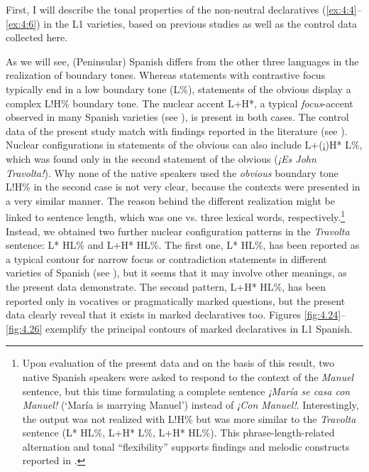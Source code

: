 First, I will describe the tonal properties of the non-neutral declaratives (\ref{ex:4:4}--\ref{ex:4:6}) in the L1 varieties, based on previous studies as well as the control data collected here.


As we will see, (Peninsular) Spanish differs from the other three languages in the realization of boundary tones. Whereas statements with contrastive focus typically end in a low boundary tone (L\%), statements of the obvious display a complex L!H\% boundary tone. The nuclear accent L+H*, a typical \textit{focus}{}-accent observed in many Spanish varieties (see \citealt{PrietoRoseano2010}), is present in both cases. The control data of the present study match with findings reported in the literature (see \citealt{Estebas-VilaplanaPrieto2010, HualdePrieto2015}). Nuclear configurations in statements of the obvious can also include L+(¡)H* L\%, which was found only in the second statement of the obvious (\textit{¡Es John Travolta!}). Why none of the native speakers used the \textit{obvious}{} boundary tone L!H\% in the second case is not very clear, because the contexts were presented in a very similar manner. The reason behind the different realization might be linked to sentence length, which was one vs. three lexical words, respectively.\footnote{Upon evaluation of the present data and on the basis of this result, two native Spanish speakers were asked to respond to the context of the \textit{Manuel} sentence, but this time formulating a complete sentence \textit{¡María se casa con Manuel!} (‘María is marrying Manuel’) instead of \textit{¡Con Manuel!}. Interestingly, the output was not realized with L!H\% but was more similar to the \textit{Travolta}{} sentence (L* HL\%, L+H* L\%, L+H* HL\%). This phrase-length-related alternation and tonal “flexibility” supports findings and melodic constructs reported in \citet{TorreiraGrice2018}.}  Instead, we obtained two further nuclear configuration patterns in the \textit{Travolta}{} sentence: L* HL\% and L+H* HL\%. The first one, L* HL\%, has been reported as a typical contour for narrow focus or contradiction statements in different varieties of Spanish (see \citealt{Estebas-VilaplanaPrieto2010}), but it seems that it may involve other meanings, as the present data demonstrate. The second pattern, L+H* HL\%, has been reported only in vocatives or pragmatically marked questions, but the present data clearly reveal that it exists in marked declaratives too. Figures \ref{fig:4.24}--\ref{fig:4.26} exemplify the principal contours of marked declaratives in L1 Spanish.


